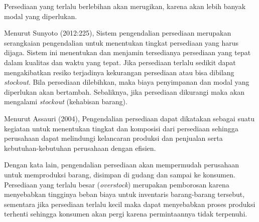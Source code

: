 \begin{spacing}{1.5}
Persediaan yang terlalu berlebihan akan merugikan, karena akan lebih banyak modal yang diperlukan.

Menurut Sunyoto (2012:225), Sistem pengendalian persediaan merupakan serangkaian pengendalian untuk menentukan tingkat persediaan yang harus dijaga. Sistem ini menentukan dan menjamin tersedianya persediaan yang tepat dalam kualitas dan waktu yang tepat. Jika persediaan terlalu sedikit dapat mengakibatkan resiko terjadinya kekurangan persediaan atau bisa dibilang \textit{stockout}. Bila persediaan dilebihkan, maka biaya penyimpanan dan modal yang diperlukan akan bertambah. Sebaliknya, jika persediaan dikurangi maka akan mengalami \textit{stockout} (kehabisan barang).
 
Menurut Assauri (2004), Pengendalian persediaan dapat dikatakan sebagai suatu kegiatan untuk menentukan tingkat dan komposisi dari persediaan sehingga perusahaan dapat melindungi kelancaran produksi dan penjualan serta kebutuhan-kebutuhan perusahaan dengan efisien.

Dengan kata lain, pengendalian persediaan akan mempermudah perusahaan untuk memproduksi barang, disimpan di gudang dan sampai ke konsumen. Persediaan yang terlalu besar (\textit{overstock}) merupakan pemborosan karena menyebabkan tingginya beban biaya untuk inventaris barang-barang tersebut, sementara jika persediaan terlalu kecil maka dapat menyebabkan proses produksi terhenti sehingga konsumen akan pergi karena permintaannya tidak terpenuhi.


	

	

	


\end{spacing}
